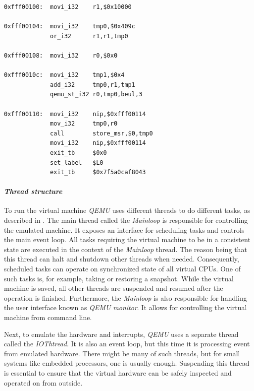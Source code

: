 \begin{minipage}{\linewidth}
\begin{lstlisting}[caption={QEMU TCG intermediate assembly code from \cite{qemutcgir}.},label={lst:tcgir}]
0xfff00100:  movi_i32    r1,$0x10000

0xfff00104:  movi_i32    tmp0,$0x409c
             or_i32      r1,r1,tmp0

0xfff00108:  movi_i32    r0,$0x0

0xfff0010c:  movi_i32    tmp1,$0x4
             add_i32     tmp0,r1,tmp1
             qemu_st_i32 r0,tmp0,beul,3

0xfff00110:  movi_i32    nip,$0xfff00114
             mov_i32     tmp0,r0
             call        store_msr,$0,tmp0
             movi_i32    nip,$0xfff00114
             exit_tb     $0x0
             set_label   $L0
             exit_tb     $0x7f5a0caf8043
\end{lstlisting}
\end{minipage}

\paragraph{\textit{Thread structure}}
To run the virtual machine \textit{QEMU} uses different threads to do different tasks, as described in \cite{qemuthreads}. The main thread called the \textit{Mainloop} is responsible for controlling the emulated machine. It exposes an interface for scheduling tasks and controls the main event loop. All tasks requiring the virtual machine to be in a consistent state are executed in the context of the \textit{Mainloop} thread. The reason being that this thread can halt and shutdown other threads when needed. Consequently, scheduled tasks can operate on synchronized state of all virtual CPUs. One of such tasks is, for example, taking or restoring a snapshot. While the virtual machine is saved, all other threads are suspended and resumed after the operation is finished. Furthermore, the \textit{Mainloop} is also responsible for handling the user interface known as \textit{QEMU monitor}. It allows for controlling the virtual machine from command line.

Next, to emulate the hardware and interrupts, \textit{QEMU} uses a separate thread called the \textit{IOThtread}. It is also an event loop, but this time it is processing event from emulated hardware. There might be many of such threads, but for small systems like embedded processors, one is usually enough. Suspending this thread is essential to ensure that the virtual hardware can be safely inspected and operated on from outside.

